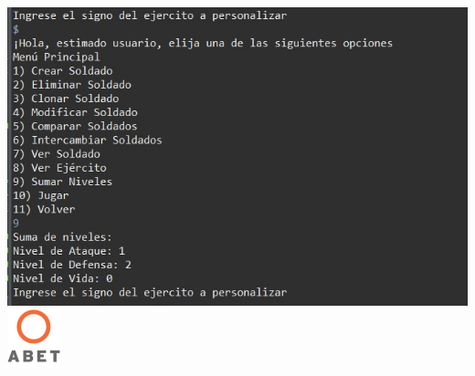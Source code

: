 \documentclass{article}
\begin{document}
\includegraphics[scale=0.50]{img/captura 6.jpeg} 
\includegraphics[scale=1]{img/logo_abet.png} 
\end{document}
